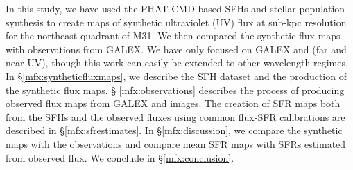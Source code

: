 In this study, we have used the PHAT CMD-based SFHs and stellar population
synthesis to create maps of synthetic ultraviolet (UV) flux at sub-kpc
resolution for the northeast quadrant of M31. We then compared the synthetic
flux maps with observations from GALEX. We have only focused on GALEX \fuv{}
and \nuv{} (far and near UV), though this work can easily be extended to other
wavelength regimes. In \S \ref{mfx:syntheticfluxmaps}, we describe the SFH
dataset and the production of the synthetic flux maps. \S
\ref{mfx:observations} describes the process of producing observed flux maps
from GALEX \fuv{} and \nuv{} images. The creation of SFR maps both from the
SFHs and the observed fluxes using common flux-SFR calibrations are described
in \S \ref{mfx:sfrestimates}. In \S \ref{mfx:discussion}, we compare the
synthetic maps with the observations and compare mean SFR maps with SFRs
estimated from observed flux. We conclude in \S \ref{mfx:conclusion}.
